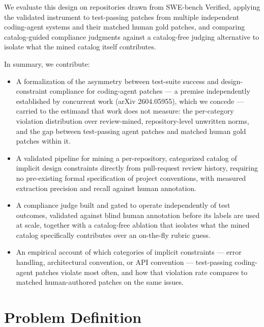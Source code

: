\documentclass[11pt]{article}
\begin{document}
We evaluate this design on repositories drawn from SWE-bench Verified, applying the validated instrument to test-passing patches from multiple independent coding-agent systems and their matched human gold patches, and comparing catalog-guided compliance judgments against a catalog-free judging alternative to isolate what the mined catalog itself contributes.

In summary, we contribute:
\begin{itemize}[leftmargin=1.4em]
\item A formalization of the asymmetry between test-suite success and design-constraint compliance for coding-agent patches --- a premise independently established by concurrent work (arXiv 2604.05955), which we concede --- carried to the estimand that work does not measure: the per-category violation distribution over review-mined, repository-level unwritten norms, and the gap between test-passing agent patches and matched human gold patches within it.
\item A validated pipeline for mining a per-repository, categorized catalog of implicit design constraints directly from pull-request review history, requiring no pre-existing formal specification of project conventions, with measured extraction precision and recall against human annotation.
\item A compliance judge built and gated to operate independently of test outcomes, validated against blind human annotation before its labels are used at scale, together with a catalog-free ablation that isolates what the mined catalog specifically contributes over an on-the-fly rubric guess.
\item An empirical account of which categories of implicit constraints --- error handling, architectural convention, or API convention --- test-passing coding-agent patches violate most often, and how that violation rate compares to matched human-authored patches on the same issues.
\end{itemize}

\section{Problem Definition}
\end{document}
